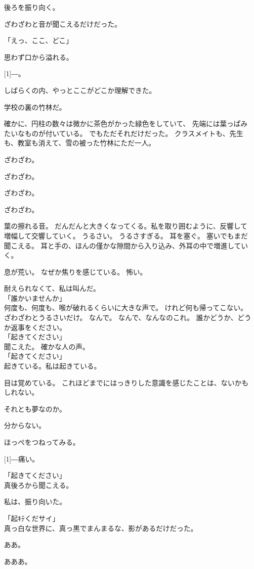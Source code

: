 \documentclass[../IHMain]{subfiles}
\begin{document}
後ろを振り向く。

ざわざわと音が聞こえるだけだった。

「えっ、ここ、どこ」

思わず口から溢れる。

\scalebox{3}[1]{―}。

しばらくの内、やっとここがどこか理解できた。

学校の裏の竹林だ。

確かに、円柱の数々は微かに茶色がかった緑色をしていて、
先端には葉っぱみたいなものが付いている。
でもただそれだけだった。
クラスメイトも、先生も、教室も消えて、雪の被った竹林にただ一人。

ざわざわ。

ざわざわ。

ざわざわ。

ざわざわ。

葉の擦れる音。
だんだんと大きくなってくる。私を取り囲むように、反響して増幅して交響していく。
うるさい。
うるさすぎる。
耳を塞ぐ。
塞いでもまだ聞こえる。
耳と手の、ほんの僅かな隙間から入り込み、外耳の中で増進していく。

息が荒い。
なぜか焦りを感じている。
怖い。

耐えられなくて、私は叫んだ。\\
「誰かいませんか」\\
何度も、何度も、喉が破れるくらいに大きな声で。
けれど何も帰ってこない。
ざわざわとうるさいだけ。
なんで。
なんで、なんなのこれ。
誰かどうか、どうか返事をください。\\
「起きてください」\\
聞こえた。
確かな人の声。\\
「起きてください」\\
起きている。私は起きている。

目は覚めている。
これほどまでにはっきりした意識を感じたことは、ないかもしれない。

それとも夢なのか。

分からない。

ほっぺをつねってみる。

\scalebox{3}[1]{―}痛い。

「起きてください」\\
真後ろから聞こえる。

私は、振り向いた。

「起ｷﾃくだサイ」\\
真っ白な世界に、真っ黒でまんまるな、影があるだけだった。

ああ。

あああ。
\end{document}
